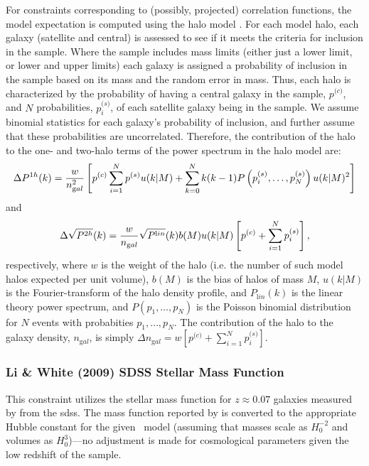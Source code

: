 For constraints corresponding to (possibly, projected) correlation functions, the model expectation is computed using the halo model \cite{cooray_halo_2002}. For each model halo, each galaxy (satellite and central) is assessed to see if it meets the criteria for inclusion in the sample. Where the sample includes mass limits (either just a lower limit, or lower and upper limits) each galaxy is assigned a probability of inclusion in the sample based on its mass and the random error in mass. Thus, each halo is characterized by the probability of having a central galaxy in the sample, $p^{\mathrm (c)}$, and $N$ probabilities, $p_i^{\mathrm (s)}$, of each satellite galaxy being in the sample. We assume binomial statistics for each galaxy's probability of inclusion, and further assume that these probabilities are uncorrelated. Therefore, the contribution of the halo to the one- and two-halo terms of the power spectrum in the halo model are:
\begin{equation}
\Delta P^{\mathrm 1h}(k) = {w \over n_{\mathrm gal}^2} \left[ p^{\mathrm (c)} \sum_{i=1}^N p^{\mathrm (s)} u(k|M) + \sum_{k=0}^N k(k-1) P\left(p_i^{\mathrm (s)},\ldots,p_N^{(s)}\right) u(k|M)^2 \right]
\end{equation}
and
\begin{equation}
\Delta \sqrt{P^{\mathrm 2h}}(k) = {w \over n_{\mathrm gal}} \sqrt{P^{\mathrm lin}}(k) b(M) u(k|M) \left[ p^{\mathrm (c)} + \sum_{i=1}^N p_i^{\mathrm (s)} \right],
\end{equation}
respectively, where $w$ is the weight of the halo (i.e. the number of such model halos expected per unit volume), $b(M)$ is the bias of halos of mass $M$, $u(k|M)$ is the Fourier-transform of the halo density profile, and $P_{\mathrm lin}(k)$ is the linear theory power spectrum, and $P(p_1,\ldots,p_N)$ is the Poisson binomial distribution for $N$ events with probabities $p_1,\ldots,p_N$. The contribution of the halo to the galaxy density, $n_{\mathrm gal}$, is simply $\Delta n_{\mathrm gal} = w \left[ p^{\mathrm (c)} + \sum_{i=1}^N p_i^{\mathrm (s)} \right]$.

\subsubsection{Li \& White (2009) SDSS Stellar Mass Function}

This constraint utilizes the stellar mass function for $z\approx 0.07$ galaxies measured by \cite{li_distribution_2009} from the \gls{sdss}. The mass function reported by \cite{li_distribution_2009} is converted to the appropriate Hubble constant for the given \glc\ model (assuming that masses scale as $H_0^{-2}$ and volumes as $H_0^3$)---no adjustment is made for cosmological parameters given the low redshift of the sample.

